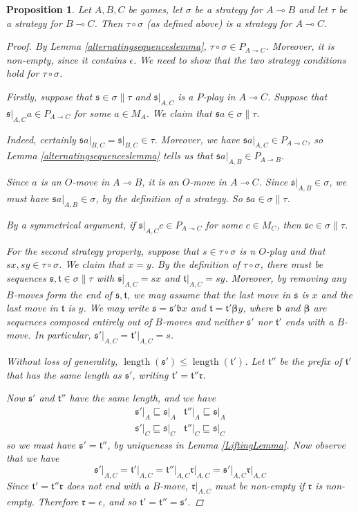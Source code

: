 \documentclass[11pt]{article} %
\theoremstyle{plain} %
\newtheorem{proposition}[theorem]{Proposition}
\theoremstyle{definition} %
\theoremstyle{note}
\theoremstyle{exercisestyle}
\renewcommand{\implies}{\multimap}
\newcommand{\comp}[2]{#1 \circ #2}
\newcommand{\s}{\mathfrak s}
\renewcommand{\t}{\mathfrak t}
\newcommand{\emptyplay}{\epsilon}
\newcommand{\prefix}{\sqsubseteq}
\DeclareMathOperator{\length}{length}
\renewcommand{\b}{\mathfrak b}
\renewcommand{\r}{\mathfrak r}
\newcommand{\bbeta}{{\bm{\beta}}}
\begin{document}
\begin{proposition}
  Let $A,B,C$ be games, let $\sigma$ be a strategy for $A\implies B$ and let $\tau$ be a strategy for $B\implies C$.  Then $\comp\tau\sigma$ (as defined above) is a strategy for $A\implies C$.  

  \begin{proof}
    By Lemma \ref{alternatingsequenceslemma}, $\comp\tau\sigma\in P_{A\implies C}$.  Moreover, it is non-empty, since it contains $\emptyplay$.  We need to show that the two strategy conditions hold for $\comp\tau\sigma$.  

    Firstly, suppose that $\s\in\sigma\|\tau$ and $\s\vert_{A,C}$ is a $P$-play in $A\implies C$.  Suppose that $\s\vert_{A,C} a\in P_{A\implies C}$ for some $a\in M_A$.  We claim that $\s a\in\sigma\|\tau$.  

    Indeed, certainly $\s a\vert_{B,C}=\s\vert_{B,C}\in\tau$.  Moreover, we have $\s a\vert_{A,C}\in P_{A\implies C}$, so Lemma \ref{alternatingsequenceslemma} tells us that $\s a\vert_{A,B}\in P_{A\implies B}$.  

    Since $a$ is an $O$-move in $A\implies B$, it is an $O$-move in $A\implies C$.  Since $\s\vert_{A,B}\in\sigma$, we must have $\s a\vert_{A,B}\in\sigma$, by the definition of a strategy.  So $\s a\in\sigma\|\tau$.  

    By a symmetrical argument, if $\s\vert_{A,C} c\in P_{A\implies C}$ for some $c\in M_C$, then $\s c\in\sigma\|\tau$.  

    For the second strategy property, suppose that $s\in\comp\tau\sigma$ is n $O$-play and that $sx, sy\in\comp\tau\sigma$.  We claim that $x=y$.  By the definition of $\comp\tau\sigma$, there must be sequences $\s,\t\in\sigma\|\tau$ with $\s\vert_{A,C}=sx$ and $\t\vert_{A,C}=sy$.  Moreover, by removing any $B$-moves form the end of $\s,\t$, we may assume that the last move in $\s$ is $x$ and the last move in $\t$ is $y$.  We may write $\s=\s'\b x$ and $\t=\t'\bbeta y$, where $\b$ and $\bbeta$ are sequences composed entirely out of $B$-moves and neither $\s'$ nor $\t'$ ends with a $B$-move.  In particular, $\s'\vert_{A,C}=\t'\vert_{A,C}=s$.

    Without loss of generality, $\length(\s')\le\length(\t')$.  Let $\t''$ be the prefix of $\t'$ that has the same length as $\s'$, writing $\t'=\t''\r$.

    Now $\s'$ and $\t''$ have the same length, and we have
    \[
      \begin{matrix}
        \s'\vert_A\prefix\s\vert_A & \t''\vert_A\prefix\s\vert_A \\
        \s'\vert_C\prefix\s\vert_C & \t''\vert_C\prefix\s\vert_C
      \end{matrix}
      \]
    so we must have $\s'=\t''$, by uniqueness in Lemma \ref{LiftingLemma}.  Now observe that we have
    \[
      \s'\vert_{A,C}=\t'\vert_{A,C}=\t''\vert_{A,C}\r\vert_{A,C}=\s'\vert_{A,C}\r\vert_{A,C}
      \]
    Since $\t'=\t''\r$ does not end with a $B$-move, $\r\vert_{A,C}$ must be non-empty if $\r$ is non-empty.  Therefore $\r=\emptyplay$, and so $\t'=\t''=\s'$.


\end{proof}
\end{proposition}
\end{document}
